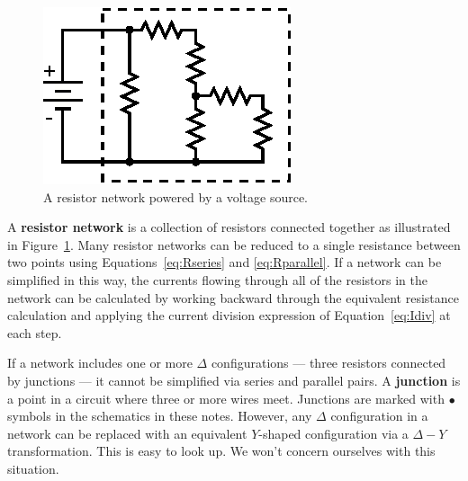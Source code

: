 \documentclass[11pt]{article}
\begin{document}
\begin{figure}[ht]
  \begin{center}
    \includegraphics{rnetwork.eps}
    \caption{A resistor network powered by a voltage source.}
    \label{fig:rnetwork}
  \end{center}
\end{figure}

A \textbf{resistor network} is a collection of resistors connected
together as illustrated in Figure~\ref{fig:rnetwork}. Many resistor
networks can be reduced to a single resistance between two points
using Equations~\ref{eq:Rseries} and \ref{eq:Rparallel}. If a network
can be simplified in this way, the currents flowing through all of the
resistors in the network can be calculated by working backward through
the equivalent resistance calculation and applying the current
division expression of Equation~\ref{eq:Idiv} at each step.

If a network includes one or more $\Delta$ configurations --- three
resistors connected by junctions --- it cannot be simplified via
series and parallel pairs. A \textbf{junction} is a point in a circuit
where three or more wires meet. Junctions are marked with $\bullet$
symbols in the schematics in these notes. However, any $\Delta$
configuration in a network can be replaced with an equivalent
$Y$-shaped configuration via a $\Delta-Y$ transformation. This is easy
to look up. We won't concern ourselves with this situation.

\begin{latexonly}
  \noindent
  \hrulefill
\end{latexonly}
\htmlrule
\end{document}
